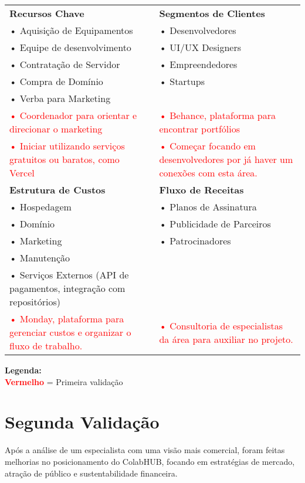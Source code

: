 \documentclass{article}
\begin{document}
\begin{table}[H]
\begin{tabular}{|p{6cm}|p{6cm}|p{6cm}|}
\hline
\rowcolor{lightgray}
\textbf{Recursos Chave} & & \textbf{Segmentos de Clientes} \\
\cline{1-1}\cline{2-2}\cline{3-3}
• Aquisição de Equipamentos & & • Desenvolvedores \\
• Equipe de desenvolvimento & & • UI/UX Designers \\
• Contratação de Servidor & & • Empreendedores \\
• Compra de Domínio & & • Startups \\
• Verba para Marketing & & \\
\textcolor{red}{• Coordenador para orientar e direcionar o marketing} &
& 
\textcolor{red}{• Behance, plataforma para encontrar portfólios} \\
\textcolor{red}{• Iniciar utilizando serviços gratuitos ou baratos, como Vercel} &
& 
\textcolor{red}{• Começar focando em desenvolvedores por já haver um conexões com esta área.} \\
\hline
\rowcolor{lightgray}
\textbf{Estrutura de Custos} & & \textbf{Fluxo de Receitas} \\
\hline
• Hospedagem & & • Planos de Assinatura \\
• Domínio & & • Publicidade de Parceiros \\
• Marketing & & • Patrocinadores \\
• Manutenção & & \\
• Serviços Externos (API de pagamentos, integração com repositórios) & & \\
\textcolor{red}{• Monday, plataforma para gerenciar custos e organizar o fluxo de trabalho.} &
&
\textcolor{red}{• Consultoria de especialistas da área para auxiliar no projeto.} \\
\hline
\end{tabular}

\begin{center}
\textbf{Legenda:} \\
\textcolor{red}{\textbf{Vermelho}} = Primeira validação
\end{center}

\end{table}

\newpage

\section*{Segunda Validação}
Após a análise de um especialista com uma visão mais comercial, foram feitas melhorias no posicionamento do ColabHUB, focando em estratégias de mercado, atração de público e sustentabilidade financeira.
\end{document}
